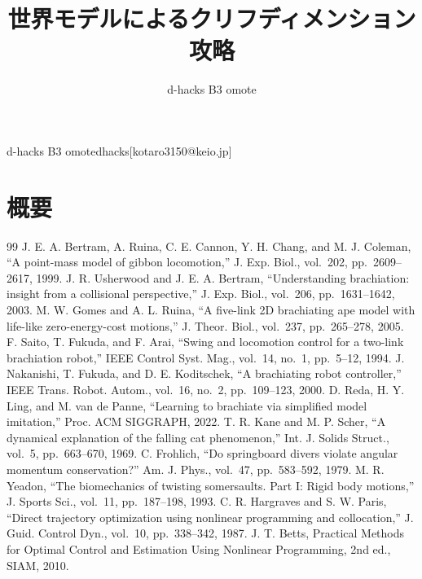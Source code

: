 \documentclass[MIRU,submit]{miru2025j}
\begin{document}
\title{世界モデルによるクリフディメンション攻略}
\author{d-hacks B3 omote}{d-hacks B3 omote}{dhacks}[kotaro3150@keio.jp]
\maketitle

\section*{概要}













\begin{thebibliography}{99}
 J. E. A. Bertram, A. Ruina, C. E. Cannon, Y. H. Chang, and M. J. Coleman, ``A point-mass model of gibbon locomotion,'' J. Exp. Biol., vol.~202, pp.~2609--2617, 1999.
 J. R. Usherwood and J. E. A. Bertram, ``Understanding brachiation: insight from a collisional perspective,'' J. Exp. Biol., vol.~206, pp.~1631--1642, 2003.
 M. W. Gomes and A. L. Ruina, ``A five-link 2D brachiating ape model with life-like zero-energy-cost motions,'' J. Theor. Biol., vol.~237, pp.~265--278, 2005.
 F. Saito, T. Fukuda, and F. Arai, ``Swing and locomotion control for a two-link brachiation robot,'' IEEE Control Syst. Mag., vol.~14, no.~1, pp.~5--12, 1994.
 J. Nakanishi, T. Fukuda, and D. E. Koditschek, ``A brachiating robot controller,'' IEEE Trans. Robot. Autom., vol.~16, no.~2, pp.~109--123, 2000.
 D. Reda, H. Y. Ling, and M. van de Panne, ``Learning to brachiate via simplified model imitation,'' Proc. ACM SIGGRAPH, 2022.
 T. R. Kane and M. P. Scher, ``A dynamical explanation of the falling cat phenomenon,'' Int. J. Solids Struct., vol.~5, pp.~663--670, 1969.
 C. Frohlich, ``Do springboard divers violate angular momentum conservation?'' Am. J. Phys., vol.~47, pp.~583--592, 1979.
 M. R. Yeadon, ``The biomechanics of twisting somersaults. Part I: Rigid body motions,'' J. Sports Sci., vol.~11, pp.~187--198, 1993.
 C. R. Hargraves and S. W. Paris, ``Direct trajectory optimization using nonlinear programming and collocation,'' J. Guid. Control Dyn., vol.~10, pp.~338--342, 1987.
 J. T. Betts, Practical Methods for Optimal Control and Estimation Using Nonlinear Programming, 2nd ed., SIAM, 2010.

\end{thebibliography}
\end{document}
